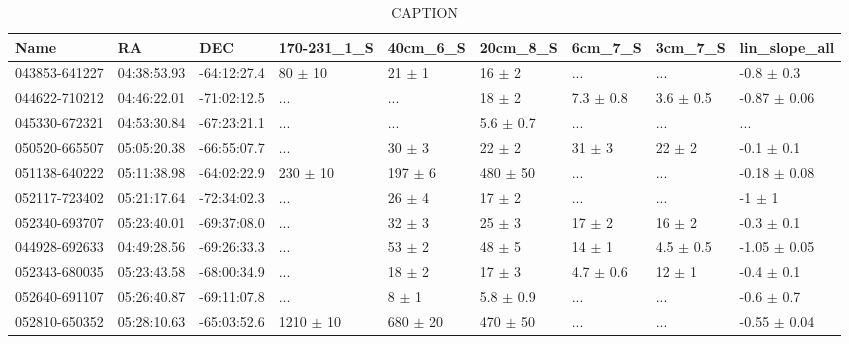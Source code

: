 \begin{table}[ht]
\centering
\begin{tabular}{lllllllll}
  \hline
Name & RA & DEC & 170-231_1_S & 40cm_6_S & 20cm_8_S & 6cm_7_S & 3cm_7_S & lin_slope_all \\ 
  \hline
043853-641227 & 04:38:53.93 & -64:12:27.4 & 80 $\pm$ 10 & 21 $\pm$ 1 & 16 $\pm$ 2 & ... & ... & -0.8 $\pm$ 0.3 \\ 
  044622-710212 & 04:46:22.01 & -71:02:12.5 & ... & ... & 18 $\pm$ 2 & 7.3 $\pm$ 0.8 & 3.6 $\pm$ 0.5 & -0.87 $\pm$ 0.06 \\ 
  045330-672321 & 04:53:30.84 & -67:23:21.1 & ... & ... & 5.6 $\pm$ 0.7 & ... & ... & ... \\ 
  050520-665507 & 05:05:20.38 & -66:55:07.7 & ... & 30 $\pm$ 3 & 22 $\pm$ 2 & 31 $\pm$ 3 & 22 $\pm$ 2 & -0.1 $\pm$ 0.1 \\ 
  051138-640222 & 05:11:38.98 & -64:02:22.9 & 230 $\pm$ 10 & 197 $\pm$ 6 & 480 $\pm$ 50 & ... & ... & -0.18 $\pm$ 0.08 \\ 
  052117-723402 & 05:21:17.64 & -72:34:02.3 & ... & 26 $\pm$ 4 & 17 $\pm$ 2 & ... & ... & -1 $\pm$ 1 \\ 
  052340-693707 & 05:23:40.01 & -69:37:08.0 & ... & 32 $\pm$ 3 & 25 $\pm$ 3 & 17 $\pm$ 2 & 16 $\pm$ 2 & -0.3 $\pm$ 0.1 \\ 
  044928-692633 & 04:49:28.56 & -69:26:33.3 & ... & 53 $\pm$ 2 & 48 $\pm$ 5 & 14 $\pm$ 1 & 4.5 $\pm$ 0.5 & -1.05 $\pm$ 0.05 \\ 
  052343-680035 & 05:23:43.58 & -68:00:34.9 & ... & 18 $\pm$ 2 & 17 $\pm$ 3 & 4.7 $\pm$ 0.6 & 12 $\pm$ 1 & -0.4 $\pm$ 0.1 \\ 
  052640-691107 & 05:26:40.87 & -69:11:07.8 & ... & 8 $\pm$ 1 & 5.8 $\pm$ 0.9 & ... & ... & -0.6 $\pm$ 0.7 \\ 
  052810-650352 & 05:28:10.63 & -65:03:52.6 & 1210 $\pm$ 10 & 680 $\pm$ 20 & 470 $\pm$ 50 & ... & ... & -0.55 $\pm$ 0.04 \\ 
   \hline
\end{tabular}
\caption{CAPTION} 
\label{fig:maintable}
\end{table}
